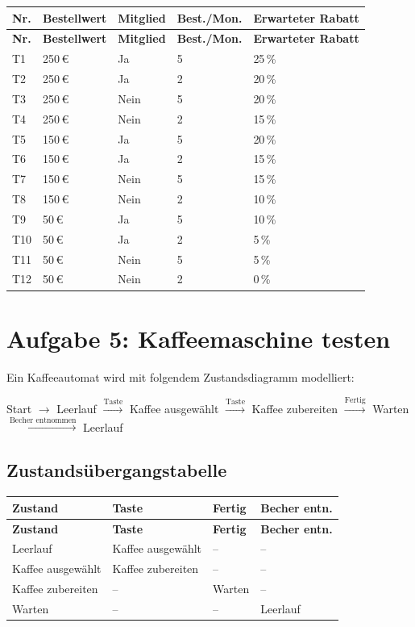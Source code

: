 \documentclass[
	fontsize=12pt,          %
	paper=a4,               %
	numbers=noenddot,       %
	listof=totoc,           %
	listof=entryprefix,     %
	listof=nochaptergap,    %
	bibliography=totoc,     %
	parskip=half,           %
	openany                 %
]{scrbook}
\begin{document}
\begin{longtable}{| p{0.5cm} | p{1.8cm} | p{1.5cm} | p{1.5cm} | p{2.5cm} |}
	\hline
	\textbf{Nr.} & \textbf{Bestellwert} & \textbf{Mitglied} & \textbf{Best./Mon.} & \textbf{Erwarteter Rabatt} \\ \hline
	\endfirsthead
	\hline
	\textbf{Nr.} & \textbf{Bestellwert} & \textbf{Mitglied} & \textbf{Best./Mon.} & \textbf{Erwarteter Rabatt} \\ \hline
	\endhead
	\hline
	\endfoot
	T1 & 250\,€ & Ja & 5 & 25\,\% \\ \hline
	T2 & 250\,€ & Ja & 2 & 20\,\% \\ \hline
	T3 & 250\,€ & Nein & 5 & 20\,\% \\ \hline
	T4 & 250\,€ & Nein & 2 & 15\,\% \\ \hline
	T5 & 150\,€ & Ja & 5 & 20\,\% \\ \hline
	T6 & 150\,€ & Ja & 2 & 15\,\% \\ \hline
	T7 & 150\,€ & Nein & 5 & 15\,\% \\ \hline
	T8 & 150\,€ & Nein & 2 & 10\,\% \\ \hline
	T9 & 50\,€ & Ja & 5 & 10\,\% \\ \hline
	T10 & 50\,€ & Ja & 2 & 5\,\% \\ \hline
	T11 & 50\,€ & Nein & 5 & 5\,\% \\ \hline
	T12 & 50\,€ & Nein & 2 & 0\,\% \\ \hline
\end{longtable}


\chapter*{Aufgabe 5: Kaffeemaschine testen}

Ein Kaffeeautomat wird mit folgendem Zustandsdiagramm modelliert:

Start $\rightarrow$ Leerlauf $\xrightarrow{\text{Taste}}$ Kaffee ausgewählt $\xrightarrow{\text{Taste}}$ Kaffee zubereiten $\xrightarrow{\text{Fertig}}$ Warten $\xrightarrow{\text{Becher entnommen}}$ Leerlauf

\section*{Zustandsübergangstabelle}

\begin{longtable}{| p{3.5cm} | p{3.5cm} | p{2.5cm} | p{3.0cm} |}
	\hline
	\textbf{Zustand} & \textbf{Taste} & \textbf{Fertig} & \textbf{Becher entn.} \\ \hline
	\endfirsthead
	\hline
	\textbf{Zustand} & \textbf{Taste} & \textbf{Fertig} & \textbf{Becher entn.} \\ \hline
	\endhead
	\hline
	\endfoot
	Leerlauf & Kaffee ausgewählt & -- & -- \\ \hline
	Kaffee ausgewählt & Kaffee zubereiten & -- & -- \\ \hline
	Kaffee zubereiten & -- & Warten & -- \\ \hline
	Warten & -- & -- & Leerlauf \\ \hline
\end{longtable}
\end{document}
